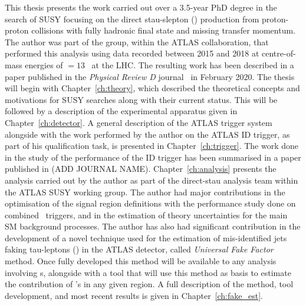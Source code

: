 This thesis presents the work carried out over a 3.5-year \ac{PhD} degree in the search of \ac{SUSY} focusing on the direct stau-slepton (\stau) production from proton-proton collisions with fully hadronic final state and missing transfer momentum. 
The author was part of the group, within the \ac{ATLAS} collaboration, that performed this analysis using data recorded between 2015 and 2018 at centre-of-mass energies of \com$=13$ \tev\ at the \ac{LHC}. 
The resulting work has been described in a paper published in the \textit{Physical Review D} journal~\cite{PhysRevD.101.032009} in February 2020. 
The thesis will begin with Chapter~\ref{ch:theory}, which described the theoretical concepts and motivations for \ac{SUSY} searches along with their current status.
This will be followed by a description of the experimental apparatus given in Chapter~\ref{ch:detector}.
A general description of the \ac{ATLAS} trigger system alongside with the work performed by the author on the \ac{ATLAS} \ac{ID} trigger, as part of his qualification task, is presented in Chapter~\ref{ch:trigger}. 
\color{purple} The work done in the study of the performance of the \ac{ID} trigger has been summarised in a paper published in (ADD JOURNAL NAME).\color{black}
Chapter~\ref{ch:analysis} presents the analysis carried out by the author as part of the direct-stau analysis team within the \ac{ATLAS} \ac{SUSY} working group. The author had major contributions in the optimisation of the signal region definitions with the performance study done on combined \ltau\ triggers, and in the estimation of theory uncertainties for the main \ac{SM} background processes. 
The author has also had significant contribution in the development of a novel technique used for the estimation of mis-identified jets faking tau-leptons (\ftau) in the \ac{ATLAS} detector, called \textit{Universal Fake Factor} method. 
Once fully developed this method will be available to any analysis involving \ltau s, alongside with a tool that will use this method as basis to estimate the contribution of \ftau 's in any given region. A full description of the method, tool development, and most recent results is given in Chapter~\ref{ch:fake_est}.
  